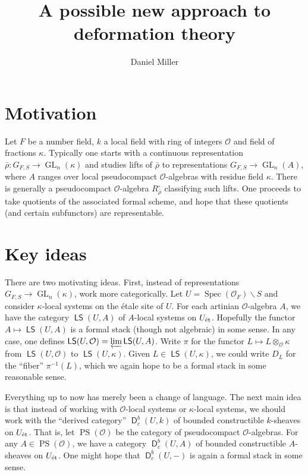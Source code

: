 \documentclass{article}
\title{A possible new approach to deformation theory}
\author{Daniel Miller}
\DeclareMathOperator{\derive}{\mathsf{D}}
\DeclareMathOperator{\GL}{GL}
\DeclareMathOperator{\localsystem}{\mathsf{LS}}
\DeclareMathOperator{\pseudocompact}{PS}
\DeclareMathOperator{\spec}{Spec}
\newcommand{\cO}{\mathcal{O}}
\newcommand{\etale}{\textnormal{\'et}}
\begin{document}
\maketitle





\section{Motivation}

Let $F$ be a number field, $k$ a local field with ring of integers $\cO$ and 
field of fractions $\kappa$. Typically one starts with a continuous 
representation $\bar\rho:G_{F,S} \to \GL_n(\kappa)$ and studies lifts of 
$\bar\rho$ to representations $G_{F,S} \to \GL_n(A)$, where $A$ ranges over 
local pseudocompact $\cO$-algebras with residue field $\kappa$. There is 
generally a pseudocompact $\cO$-algebra $R_{\bar\rho}^\square$ classifying 
such lifts. One proceeds to take quotients of the associated formal scheme, 
and hope that these quotients (and certain subfunctors) are representable. 





\section{Key ideas}

There are two motivating ideas. First, instead of representations 
$G_{F,S}\to \GL_n(\kappa)$, work more categorically. Let 
$U=\spec(\cO_F)\smallsetminus S$ and consider $\kappa$-local systems on 
the \'etale site of $U$. For each artinian $\cO$-algebra $A$, we have the 
category $\localsystem(U,A)$ of $A$-local systems on $U_\etale$. Hopefully 
the functor $A\mapsto\localsystem(U,A)$ is a formal stack (though not 
algebraic) in some sense. In any case, one defines 
$\localsystem(U,\cO) = \varprojlim \localsystem(U,A)$. Write 
$\pi$ for the functor $L\mapsto L\otimes_\cO \kappa$ from 
$\localsystem(U,\cO)$ to $\localsystem(U,\kappa)$. Given 
$L\in \localsystem(U,\kappa)$, we could write $D_L$ for the ``fiber'' 
$\pi^{-1}(L)$, which we again hope to be a formal stack in some reasonable 
sense. 

Everything up to now has merely been a change of language. The next main 
idea is that instead of working with $\cO$-local systems or 
$\kappa$-local systems, we should work with the ``derived category'' 
$\derive_c^b(U,k)$ of bounded constructible $k$-sheaves on 
$U_\etale$. That is, let $\pseudocompact(\cO)$ be the category of 
pseudocompact $\cO$-algebras. For any $A\in \pseudocompact(\cO)$, we have a 
category $\derive_c^b(U,A)$ of bounded constructible $A$-sheaves on $U_\etale$. 
One might hope that $\derive_c^b(U,-)$ is again a formal stack in some sense. 
\end{document}
